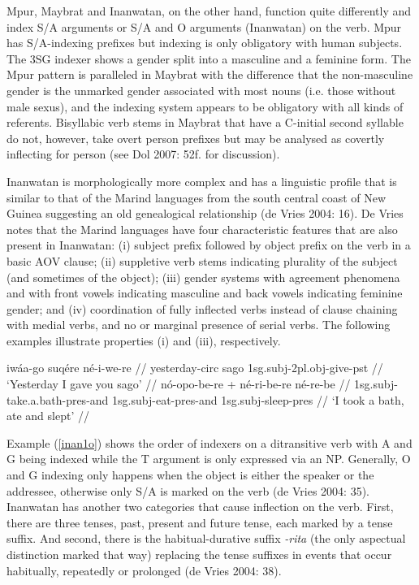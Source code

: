 Mpur, Maybrat and Inanwatan, on the other hand, function quite differently and index S/A arguments or S/A and O arguments (Inanwatan) on the verb. Mpur has S/A-indexing prefixes but indexing is only obligatory with human subjects. The 3SG indexer shows a gender split into a masculine and a feminine form. The Mpur pattern is paralleled in Maybrat with the difference that the non-masculine gender is the unmarked gender associated with most nouns (i.e. those without male sexus), and the indexing system appears to be obligatory with all kinds of referents. Bisyllabic verb stems in Maybrat that have a C-initial second syllable do not, however, take overt person prefixes but may be analysed as covertly inflecting for person (see Dol 2007: 52f. for discussion).

Inanwatan is morphologically more complex and has a linguistic profile that is similar to that of the Marind languages from the south central coast of New Guinea suggesting an old genealogical relationship (de Vries  2004: 16). De Vries notes that the Marind languages have four characteristic features that are also present in Inanwatan: (i) subject prefix followed by object prefix on the verb in a basic AOV clause; (ii) suppletive verb stems indicating plurality of the subject (and sometimes of the object); (iii) gender systems with agreement phenomena and with front vowels indicating masculine and back vowels indicating feminine gender; and (iv) coordination of fully inflected verbs instead of clause chaining with medial verbs, and no or marginal presence of serial verbs. The following examples illustrate properties (i) and (iii), respectively.

\pex 
\a \label{inan1o}
\begingl
\gla iwáa-go suqére né-i-we-re // 
\glb yesterday-\acs{circ} sago \acs{1}\acs{sg}.\acs{subj}-\acs{2}\acs{pl}.\acs{obj}-give-\acs{pst} //
\glft `Yesterday I gave you sago' // 
\endgl
\a \label{inan2o}
\begingl[glhangstyle=none]
\gla nó-opo-be-re + né-ri-be-re né-re-be // 
\glb \acs{1}\acs{sg}.\acs{subj}-take.a.bath-\acs{pres}-and \acs{1}\acs{sg}.\acs{subj}-eat-\acs{pres}-and \acs{1}\acs{sg}.\acs{subj}-sleep-\acs{pres} //
\glft `I took a bath, ate and slept' // 
\endgl
\xe

Example (\ref{inan1o}) shows the order of indexers on a ditransitive verb with A and G being indexed while the T argument is only expressed via an NP. Generally, O and G indexing only happens when the object is either the speaker or the addressee, otherwise only S/A is marked on the verb (de Vries 2004: 35). Inanwatan has another two categories that cause inflection on the verb. First, there are three tenses, past, present and future tense, each marked by a tense suffix. And second, there is the habitual-durative suffix \textit{-rita} (the only aspectual distinction marked that way) replacing the tense suffixes in events that occur habitually, repeatedly or prolonged (de Vries 2004: 38).

